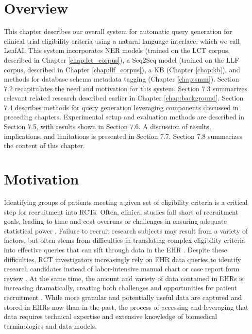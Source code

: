 \documentclass[../main.tex]{subfiles}
\begin{document}
\section{Overview}

This chapter describes our overall system for automatic query generation for clinical trial eligibility criteria using a natural language interface, which we call LeafAI. This system incorporates NER models (trained on the LCT corpus, described in Chapter \ref{chap:lct_corpus}), a Seq2Seq model (trained on the LLF corpus, described in Chapter \ref{chap:llf_corpus}), a KB (Chapter \ref{chap:kb}), and methods for database schema metadata tagging (Chapter \ref{chap:smm}). Section 7.2 recapitulates the need and motivation for this system. Section 7.3 summarizes relevant related research described earlier in Chapter \ref{chap:background}. Section 7.4 describes methods for query generation leveraging components discussed in preceding chapters. Experimental setup and evaluation methods are described in Section 7.5, with results shown in Section 7.6. A discussion of results, implications, and limitations is presented in Section 7.7. Section 7.8 summarizes the content of this chapter.

\section{Motivation}

Identifying groups of patients meeting a given set of eligibility criteria is a critical step for recruitment into RCTs. Often, clinical studies fall short of recruitment goals, leading to time and cost overruns or challenges in ensuring adequate statistical power \cite{gul2010clinical, adams2015barriers}. Failure to recruit research subjects may result from a variety of factors, but often stems from difficulties in translating complex eligibility criteria into effective queries that can sift through data in the EHR \cite{wang2017classifying}. Despite these difficulties, RCT investigators increasingly rely on EHR data queries to identify research candidates instead of labor-intensive manual chart or case report form review \cite{cowie2017electronic}. At the same time, the amount and variety of data contained in EHRs is increasing dramatically, creating both challenges and opportunities for patient recruitment \cite{lee2017medical}. While more granular and potentially useful data are captured and stored in EHRs now than in the past, the process of accessing and leveraging that data requires technical expertise and extensive knowledge of biomedical terminologies and data models. 
\end{document}
